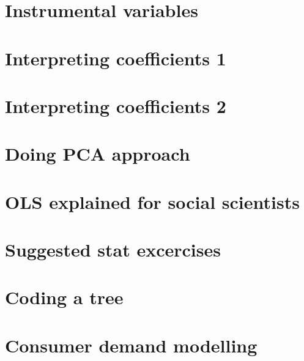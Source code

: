 \documentclass[letterpaper,10pt,english]{sphinxmanual}
\begin{document}
\section{Instrumental variables}
\label{\detokenize{tweets:instrumental-variables}}



\section{Interpreting coefficients 1}
\label{\detokenize{tweets:interpreting-coefficients-1}}



\section{Interpreting coefficients 2}
\label{\detokenize{tweets:interpreting-coefficients-2}}



\section{Doing PCA approach}
\label{\detokenize{tweets:doing-pca-approach}}



\section{OLS explained for social scientists}
\label{\detokenize{tweets:ols-explained-for-social-scientists}}



\section{Suggested stat excercises}
\label{\detokenize{tweets:suggested-stat-excercises}}



\section{Coding a tree}
\label{\detokenize{tweets:coding-a-tree}}



\section{Consumer demand modelling}
\label{\detokenize{tweets:consumer-demand-modelling}}
\end{document}
